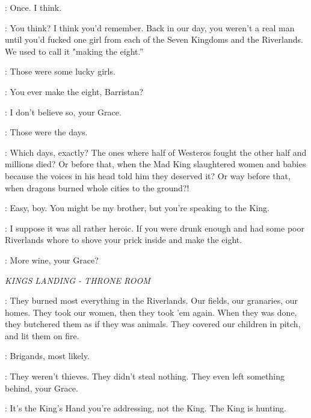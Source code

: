 \RENLY:  Once. I think. 

\ROBERT:  You think? I think you'd remember. Back in our day, you weren't a real man until you'd fucked one girl from each of the Seven Kingdoms and the Riverlands. We used to call it "making the eight.'' 

\RENLY:  Those were some lucky girls. 

\ROBERT:  You ever make the eight, Barristan? 

\SELMY:  I don't believe so, your Grace. 

\ROBERT:  Those were the days. 

\RENLY:  Which days, exactly? The ones where half of Westeros fought the other half and millions died?  Or before that, when the Mad King slaughtered women and babies because the voices in his head told him they deserved it? Or way before that, when dragons burned whole cities to the ground?! 

\ROBERT:  Easy, boy. You might be my brother, but you're speaking to the King. 

\RENLY:  I suppose it was all rather heroic. If you were drunk enough and had some poor Riverlands whore to shove your prick inside and make the eight.  


\LANCEL:  More wine, your Grace? 


\scene

\textit{KINGS LANDING - THRONE ROOM} 


\SOUTHERNFARMER:  They burned most everything in the Riverlands.  Our fields, our granaries,  our homes. They took our women, then they took 'em again. When they was done, they butchered them as if they was animals. They covered our children in pitch, and lit them on fire. 

\PYCELLE:  Brigands, most likely. 

\SOUTHERNFARMER:  They weren't thieves. They didn't steal nothing.  They even left something behind, your Grace. 

\PYCELLE:  It's the King's Hand you're addressing, not the King. The King is hunting. 


